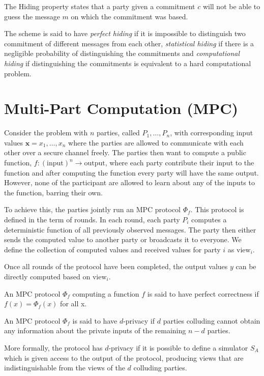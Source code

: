 \begin{definition}[hiding]
The Hiding property states that a party given a commitment $c$ will not be able
to guess the message $m$ on which the commitment was based.

The scheme is said to have \textit{perfect hiding} if it is impossible to
distinguish two commitment of different messages from each other,
\textit{statistical hiding} if there is a negligible probability of
distinguishing the commitments and \textit{computational hiding} if
distinguishing the commitments is equivalent to a hard computational problem.
\end{definition}


\section{Multi-Part Computation (MPC)}
\label{sec:background:mpc}
Consider the problem with $n$ parties, called $P_{1}, \dots, P_{n}$, with
corresponding input values $\textbf{x} = x_{1}, \dots, x_{n}$ where the parties
are allowed to communicate with each other over a secure channel freely.
The parties then want to compute a public function,
$f : (\text{input})^{n} \rightarrow \text{output}$, where each party contribute
their input to the function and after computing the function every party will
have the same output. However, none of the participant are allowed to learn
about any of the inputs to the function, barring their own.

To achieve this, the parties jointly run an MPC protocol $\Phi_{f}$. This protocol
is defined in the term of rounds.
In each round, each party $P_{i}$ computes
a deterministic function of all previously observed messages.
The party then either sends the computed value to another party or broadcasts it to everyone.
We define the collection of computed values and received values for party $i$ as $\text{view}_{i}$.

Once all rounds of the protocol have been completed, the output values $y$ can be
directly computed based on $\text{view}_{i}$.



\begin{definition}[correctness]
  \label{def:mpc:correctness}
  An MPC protocol $\Phi_{f}$ computing a function $f$ is said to have perfect
  correctness if $f(x) = \Phi_{f}(x)$ for all x.
\end{definition}

\begin{definition}[d-Privacy]
\label{def:mpc:d-privacy}
  An MPC protocol $\Phi_{f}$ is said to have $d$-privacy if $d$ parties colluding
  cannot obtain any information about the private inputs of the remaining $n-d$ parties.

  More formally, the protocol has $d$-privacy if it is possible to define a
  simulator $S_{A}$ which is given access to the output of the protocol,
  producing views that are indistinguishable from the views of the $d$ colluding
  parties.
\end{definition}

